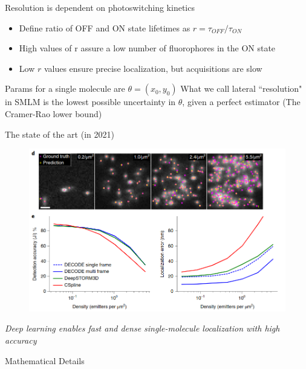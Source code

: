 \documentclass[aspectratio=169]{beamer}
\begin{document}
\begin{frame}{Resolution is dependent on photoswitching kinetics}

\begin{itemize}
\item Define ratio of OFF and ON state lifetimes as $r=\tau_{OFF} /\tau_{ON}$​
\item High values of r assure a low number of fluorophores in the ON state​
\item Low $r$ values ensure precise localization, but acquisitions are slow
\end{itemize}
\vspace{0.2in}
Params for a single molecule are $\theta = (x_{0},y_{0})$
\vspace{0.1in}
What we call lateral ``resolution" in SMLM is the lowest possible uncertainty in $\theta$, given a perfect estimator (The Cramer-Rao lower bound)


\end{frame}

\begin{frame}{The state of the art (in 2021)}
\begin{figure}
\includegraphics[scale=0.3]{Figure-6}
\end{figure}
\textit{Deep learning enables fast and dense single-molecule localization with high accuracy}
\end{frame}



\begin{frame}[plain]
  \centering
  \Large Mathematical Details
\end{frame}
\end{document}
